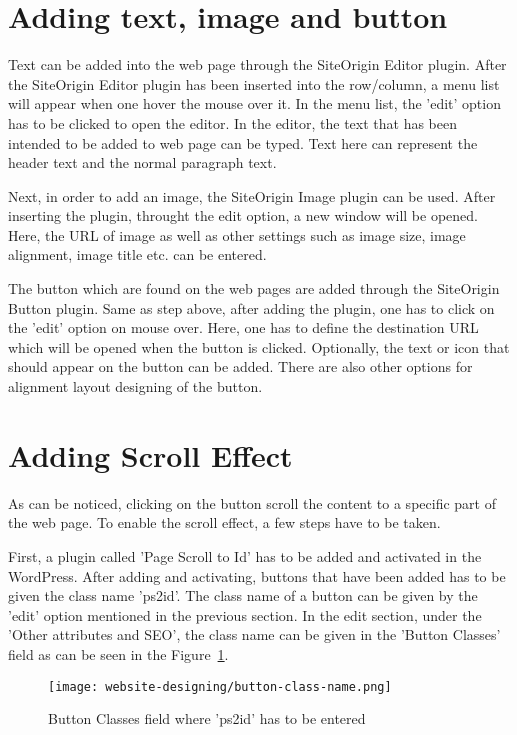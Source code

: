 \section{Adding text, image and button}
Text can be added into the web page through the SiteOrigin Editor plugin. After the SiteOrigin Editor plugin has been inserted into the row/column, a menu list will appear when one hover the mouse over it. In the menu list, the 'edit' option has to be clicked to open the editor. In the editor, the text that has been intended to be added to web page can be typed. Text here can represent the header text and the normal paragraph text.

Next, in order to add an image, the SiteOrigin Image plugin can be used. After inserting the plugin, throught the edit option, a new window will be opened. Here, the URL of image as well as other settings such as image size, image alignment, image title etc. can be entered.

The button which are found on the web pages are added through the SiteOrigin Button plugin. Same as step above, after adding the plugin, one has to click on the 'edit' option on mouse over. Here, one has to define the destination URL which will be opened when the button is clicked. Optionally, the text or icon that should appear on the button can be added. There are also other options for alignment layout designing of the button.

\section{Adding Scroll Effect}
As can be noticed, clicking on the button scroll the content to a specific part of the web page. To enable the scroll effect, a few steps have to be taken.

First, a plugin called 'Page Scroll to Id' has to be added and activated in the WordPress. After adding and activating, buttons that have been added has to be given the class name 'ps2id'. The class name of a button can be given by the 'edit' option mentioned in the previous section. In the edit section, under the 'Other attributes and SEO', the class name can be given in the 'Button Classes' field as can be seen in the Figure~\ref{button-class-name}.

\begin{figure}[h]
\centering
\caption{Button Classes field where 'ps2id' has to be entered}
\label{button-class-name}
\texttt{[image: website-designing/button-class-name.png]}
\end{figure}


